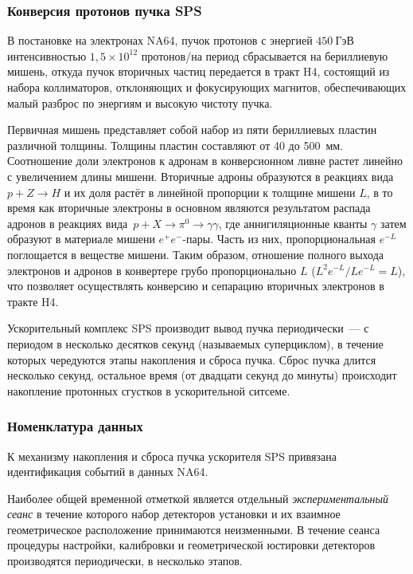 \subsubsection{Конверсия протонов пучка SPS}

В постановке на электронах NA64, пучок протонов с энергией $450~\text{ГэВ}$
интенсивностью $1{,}5 \times 10^{12}$ протонов/на период сбрасывается
на бериллиевую мишень, откуда пучок вторичных частиц передается в
тракт H4, состоящий из набора коллиматоров, отклоняющих и фокусирующих
магнитов, обеспечивающих малый разброс по энергиям и высокую чистоту пучка.

Первичная мишень представляет собой набор из пяти бериллиевых пластин
различной толщины. Толщины пластин составляют от 40 до 500~мм.
Соотношение
доли электронов к адронам в конверсионном ливне растет линейно с
увеличением длины мишени. Вторичные адроны образуются в реакциях вида
$p + Z \rightarrow H$ и их доля растёт в линейной пропорции к толщине
мишени $L$, в то время как вторичные электроны в основном являются результатом
распада адронов в реакциях
вида~$p + X \rightarrow \pi^0 \rightarrow \gamma \gamma$, где
аннигиляционные кванты $\gamma$ затем образуют в материале мишени
$e^{+}e^{-}$-пары. Часть из них, пропорциональная $e^{-L}$ поглощается
в веществе мишени. Таким образом, отношение полного выхода электронов и
адронов в конвертере грубо пропорционально $L$ ($L^2 e^{-L}/L e^{-L} = L$),
что позволяет осуществлять конверсию и сепарацию вторичных
электронов в тракте H4.

Ускорительный комплекс SPS производит вывод пучка периодически~---
с периодом в несколько десятков секунд (называемых суперциклом),
в течение которых чередуются этапы накопления и сброса пучка.
Сброс пучка длится несколько секунд, остальное время (от двадцати
секунд до минуты) происходит накопление протонных сгустков в
ускорительной ситсеме.

\subsubsection{Номенклатура данных}

К механизму накопления и сброса пучка ускорителя SPS привязана
идентификация событий в данных NA64.

Наиболее общей временной отметкой является отдельный
\emph{экспериментальный сеанс} в течение которого набор
детекторов установки и их взаимное геометрическое расположение
принимаются неизменными. В течение сеанса
процедуры настройки, калибровки и геометрической юстировки
детекторов производятся периодически, в несколько этапов.

